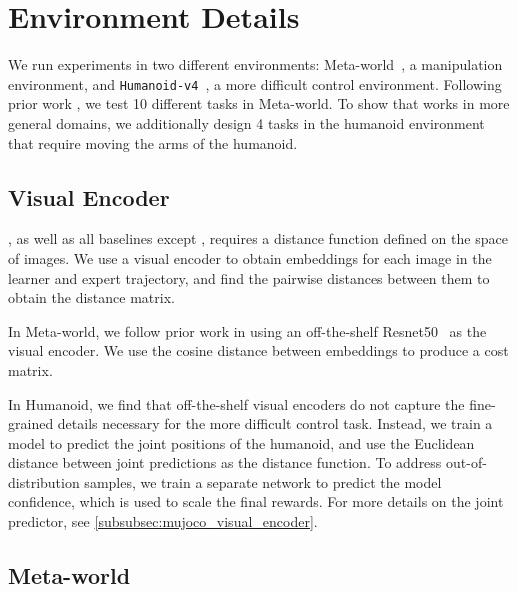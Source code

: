 
\section{Environment Details\label{app:env_details}}

We run experiments in two different environments: Meta-world~\cite{yu2021metaworldbenchmarkevaluationmultitask}, a manipulation environment, and \texttt{Humanoid-v4}~\citep{mujoco}, a more difficult control environment. Following prior work \cite{fu2024robot}, we test 10 different tasks in Meta-world. To show that \orca{} works in more general domains, we additionally design 4 tasks in the humanoid environment that require moving the arms of the humanoid.

\subsection{Visual Encoder}
\orca{}, as well as all baselines except \roboclip{}, requires a distance function defined on the space of images. We use a visual encoder to obtain embeddings for each image in the learner and expert trajectory, and find the pairwise distances between them to obtain the distance matrix.

In Meta-world, we follow prior work \cite{fu2024robot} in using an off-the-shelf Resnet50~\cite{he2015deepresiduallearningimage} as the visual encoder. We use the cosine distance between embeddings to produce a cost matrix. 

In Humanoid, we find that off-the-shelf visual encoders do not capture the fine-grained details necessary for the more difficult control task. Instead, we train a model to predict the joint positions of the humanoid, and use the Euclidean distance between joint predictions as the distance function. To address out-of-distribution samples, we train a separate network to predict the model confidence, which is used to scale the final rewards. For more details on the joint predictor, see \ref{subsubsec:mujoco_visual_encoder}.

\subsection{Meta-world}
